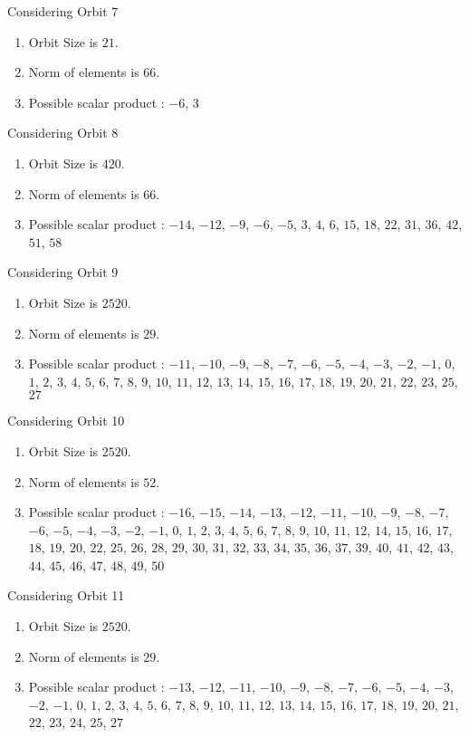 \documentclass[12pt]{article}
\begin{document}
Considering Orbit 7
\begin{enumerate}
\item Orbit Size is $21$.
\item Norm of elements is $66$.
\item Possible scalar product : $-6$, $3$
\end{enumerate}
Considering Orbit 8
\begin{enumerate}
\item Orbit Size is $420$.
\item Norm of elements is $66$.
\item Possible scalar product : $-14$, $-12$, $-9$, $-6$, $-5$, $3$, $4$, $6$, $15$, $18$, $22$, $31$, $36$, $42$, $51$, $58$
\end{enumerate}
Considering Orbit 9
\begin{enumerate}
\item Orbit Size is $2520$.
\item Norm of elements is $29$.
\item Possible scalar product : $-11$, $-10$, $-9$, $-8$, $-7$, $-6$, $-5$, $-4$, $-3$, $-2$, $-1$, $0$, $1$, $2$, $3$, $4$, $5$, $6$, $7$, $8$, $9$, $10$, $11$, $12$, $13$, $14$, $15$, $16$, $17$, $18$, $19$, $20$, $21$, $22$, $23$, $25$, $27$
\end{enumerate}
Considering Orbit 10
\begin{enumerate}
\item Orbit Size is $2520$.
\item Norm of elements is $52$.
\item Possible scalar product : $-16$, $-15$, $-14$, $-13$, $-12$, $-11$, $-10$, $-9$, $-8$, $-7$, $-6$, $-5$, $-4$, $-3$, $-2$, $-1$, $0$, $1$, $2$, $3$, $4$, $5$, $6$, $7$, $8$, $9$, $10$, $11$, $12$, $14$, $15$, $16$, $17$, $18$, $19$, $20$, $22$, $25$, $26$, $28$, $29$, $30$, $31$, $32$, $33$, $34$, $35$, $36$, $37$, $39$, $40$, $41$, $42$, $43$, $44$, $45$, $46$, $47$, $48$, $49$, $50$
\end{enumerate}
Considering Orbit 11
\begin{enumerate}
\item Orbit Size is $2520$.
\item Norm of elements is $29$.
\item Possible scalar product : $-13$, $-12$, $-11$, $-10$, $-9$, $-8$, $-7$, $-6$, $-5$, $-4$, $-3$, $-2$, $-1$, $0$, $1$, $2$, $3$, $4$, $5$, $6$, $7$, $8$, $9$, $10$, $11$, $12$, $13$, $14$, $15$, $16$, $17$, $18$, $19$, $20$, $21$, $22$, $23$, $24$, $25$, $27$
\end{enumerate}
\end{document}
